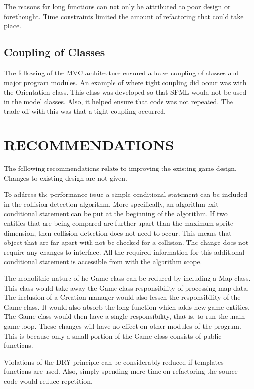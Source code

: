 \documentclass[10pt,twocolumn]{witseiepaper}
\begin{document}
The reasons for long functions can not only be attributed to poor design or forethought. Time constraints limited the amount of refactoring that could take place. 

\subsection{Coupling of Classes}
The following of the MVC architecture ensured a loose coupling of classes and major program modules. An example of where tight coupling did occur was with the Orientation class. This class was developed so that SFML would not be used in the model classes. Also, it helped ensure that code was not repeated. The trade-off with this was that a tight coupling occurred.

%
\section{RECOMMENDATIONS} %

The following recommendations relate to improving the existing game design. Changes to existing design are not given.

To address the performance issue a simple conditional statement can be included in the collision detection algorithm. More specifically, an algorithm exit conditional statement can be put at the beginning of the algorithm. If two entities that are being compared are further apart than the maximum sprite dimension, then collision detection does not need to occur. This means that object that are far apart with not be checked for a collision. The change does not require any changes to interface. All the required information for this additional conditional statement is accessible from with the algorithm scope.

The monolithic nature of he Game class can be reduced by including a Map class. This class would take away the Game class responsibility of processing map data.  The inclusion of a Creation manager would also lessen the responsibility of the Game class. It would also absorb the long function which adds new game entities.  The Game class would then have a single responsibility, that is, to run the main game loop. These changes will have no effect on other modules of the program. This is because only a small portion of the Game class consists of public functions.

Violations of the DRY principle can be considerably reduced if templates functions are used. Also, simply spending more time on refactoring the source code would reduce repetition. 
\end{document}
